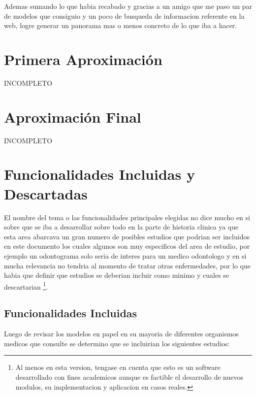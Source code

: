 Ademas sumando lo que habia recabado y gracias a un amigo que me paso un par de modelos 
que consiguio y un poco de busqueda de informacion referente en la web, logre generar un 
panorama mas o menos concreto de lo que iba a hacer.  

\section{Primera Aproximaci\'on}

INCOMPLETO

\section{Aproximaci\'on Final}

INCOMPLETO

\section{Funcionalidades Incluidas y Descartadas}

El nombre del tema o las funcionalidades principales elegidas no dice mucho en 
si sobre que se iba a desarrollar sobre todo en la parte de historia clinica 
ya que esta area abarcava un gran numero de posibles estudios que podrian ser 
incluidos en este documento los cuales algunos son muy especificos del area
de estudio, por ejemplo un odontograma solo seria de interes para un medico
odontologo y en si mucha relevancia no tendria al momento de tratar otras 
enfermedades, por lo que habia que definir que estudios se deberian incluir 
como minimo y cuales se descartarian \footnote{Al menos en esta version, tengase en cuenta que 
esto es un software desarrollado con fines academicos aunque es factible el 
desarrollo de nuevos modulos, su implementacion y aplicacion en casos reales.}.


\subsection{Funcionalidades Incluidas}

Luego de revisar los modelos en papel en su mayoria de diferentes organismos
medicos que consulte se determino que se incluirian los siguientes estudios:

